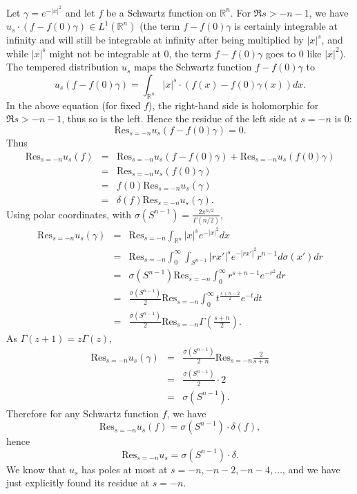 \documentclass{article}
\newcommand{\Res}{\textrm{Res}}
\begin{document}
Let $\gamma=e^{-|x|^2}$ and let $f$ be a Schwartz function on $\mathbb{R}^n$. For $\Re s > -n-1$, we have $u_s \cdot (f-f(0)\gamma) \in L^1(\mathbb{R}^n)$ (the term
$f-f(0)\gamma$ is certainly integrable at infinity and will still be integrable at infinity after being multiplied by $|x|^s$, and while $|x|^s$ might not be
integrable at $0$, the term $f-f(0)\gamma$ goes to $0$ like $|x|^2$). The tempered distribution
$u_s$ maps the Schwartz function $f-f(0)\gamma$ to
\[
u_s(f-f(0)\gamma)=\int_{\mathbb{R}^n} |x|^s \cdot (f(x)-f(0)\gamma(x)) dx.
\]
In the above equation (for fixed $f$), the right-hand side is holomorphic for $\Re s>-n-1$, thus so is the left. Hence the residue of the left side at $s=-n$ is $0$: 
\[
\Res_{s=-n} u_s(f-f(0)\gamma)=0.
\]
Thus
\begin{eqnarray*}
\Res_{s=-n} u_s(f)&=&\Res_{s=-n} u_s(f-f(0)\gamma)+\Res_{s=-n} u_s(f(0)\gamma)\\
&=&\Res_{s=-n} u_s(f(0)\gamma)\\
&=&f(0)\Res_{s=-n} u_s(\gamma)\\
&=&\delta(f) \Res_{s=-n} u_s(\gamma).
\end{eqnarray*}
Using polar coordinates, with $\sigma(S^{n-1})=\frac{2\pi^{n/2}}{\Gamma(n/2)}$,
\begin{eqnarray*}
\Res_{s=-n} u_s(\gamma)&=&\Res_{s=-n} \int_{\mathbb{R}^n} |x|^s e^{-|x|^2} dx\\
&=&\Res_{s=-n} \int_0^\infty \int_{S^{n-1}} |rx'|^s e^{-|rx'|^2} r^{n-1} d\sigma(x') dr\\
&=&\sigma(S^{n-1}) \Res_{s=-n} \int_0^\infty r^{s+n-1} e^{-r^2} dr\\
&=&\frac{\sigma(S^{n-1})}{2} \Res_{s=-n} \int_0^\infty t^{\frac{s+n-2}{2}} e^{-t} dt\\
&=&\frac{\sigma(S^{n-1})}{2} \Res_{s=-n} \Gamma(\frac{s+n}{2}).
\end{eqnarray*}
As $\Gamma(z+1)=z\Gamma(z)$,
\begin{eqnarray*}
\Res_{s=-n} u_s(\gamma) &=& \frac{\sigma(S^{n-1})}{2} \Res_{s=-n} \frac{2}{s+n}\\
&=&\frac{\sigma(S^{n-1})}{2} \cdot 2\\
&=&\sigma(S^{n-1}).
\end{eqnarray*}
Therefore for any Schwartz function $f$, we have 
\[
\Res_{s=-n} u_s(f)=\sigma(S^{n-1}) \cdot \delta(f),
\]
hence
\[
\Res_{s=-n} u_s=\sigma(S^{n-1}) \cdot \delta.
\]
We know that $u_s$ has poles at most at $s=-n,-n-2,-n-4,\ldots$, and we have just explicitly found its residue at $s=-n$. 
\end{document}
